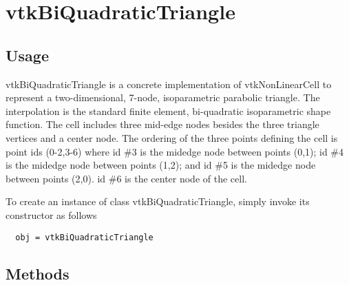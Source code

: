 \section{vtkBiQuadraticTriangle}

\subsection{Usage}

 vtkBiQuadraticTriangle is a concrete implementation of vtkNonLinearCell to
 represent a two-dimensional, 7-node, isoparametric parabolic triangle. The
 interpolation is the standard finite element, bi-quadratic isoparametric
 shape function. The cell includes three mid-edge nodes besides the three
 triangle vertices and a center node. The ordering of the three points defining the cell is 
 point ids (0-2,3-6) where id \#3 is the midedge node between points
 (0,1); id \#4 is the midedge node between points (1,2); and id \#5 is the 
 midedge node between points (2,0). id \#6 is the center node of the cell.

To create an instance of class vtkBiQuadraticTriangle, simply
invoke its constructor as follows
\begin{verbatim}
  obj = vtkBiQuadraticTriangle
\end{verbatim}
\subsection{Methods}

